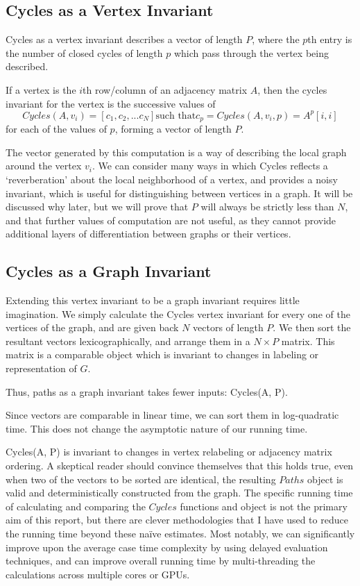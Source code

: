 \subsection{Cycles as a Vertex Invariant}

Cycles as a vertex invariant describes a vector of length $P$, where the $p$th entry is the number of closed cycles of length $p$ which pass through the vertex being described.

If a vertex is the $i$th row/column of an adjacency matrix $A$, then the cycles invariant for the vertex is the successive values of 
$$Cycles(A, v_i) = [c_1, c_2, ... c_N] \text{such that} c_p = Cycles(A, v_i, p) = A^p[i,i]$$
for each of the values of $p$, forming a vector of length $P$.

The vector generated by this computation is a way of describing the local graph around the vertex $v_i$.
We can consider many ways in which Cycles reflects a `reverberation' about the local neighborhood of a vertex, and provides a noisy invariant, which is useful for distinguishing between vertices in a graph. 
It will be discussed why later, but we will prove that $P$ will always be strictly less than $N$, and that further values of computation are not useful, as they cannot provide additional layers of differentiation between graphs or their vertices.


\subsection{Cycles as a Graph Invariant}

Extending this vertex invariant to be a graph invariant requires little imagination. 
We simply calculate the Cycles vertex invariant for every one of the vertices of the graph, and are given back $N$ vectors of length $P$.
We then sort the resultant vectors lexicographically, and arrange them in a $N \times P$ matrix.
This matrix is a comparable object which is invariant to changes in labeling or representation of $G$.

Thus, paths as a graph invariant takes fewer inputs: Cycles(A, P).

Since vectors are comparable in linear time, we can sort them in log-quadratic time.
This does not change the asymptotic nature of our running time.

Cycles(A, P) is invariant to changes in vertex relabeling or adjacency matrix ordering.
A skeptical reader should convince themselves that this holds true, even when two of the vectors to be sorted are identical, the resulting $Paths$ object is valid and deterministically constructed from the graph.
The specific running time of calculating and comparing the $Cycles$ functions and object is not the primary aim of this report, but there are clever methodologies that I have used to reduce the running time beyond these na\"{i}ve estimates.
Most notably, we can significantly improve upon the average case time complexity by using delayed evaluation techniques, and can improve overall running time by multi-threading the calculations across multiple cores or GPUs.

